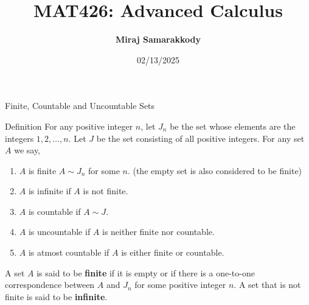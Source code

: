 \documentclass{beamer}
\title{MAT426: Advanced Calculus}
\author{\textbf{Miraj Samarakkody}}
\institute{Tougaloo College}
\date{02/13/2025}
\begin{document}
\begin{frame}
    \titlepage
\end{frame}

\begin{frame}{Finite, Countable and Uncountable Sets}
    \begin{block}{Definition}
        For any positive integer \(n\), let \(J_n\) be the set whose elements are the integers \(1, 2, \ldots, n\). Let \(J\) be the set consisting of all positive integers. For any set \(A\) we say, 
        \begin{enumerate}
            \item \(A\) is finite \(A \sim J_n\) for some \(n\). (the empty set is also considered to be finite)
            \item \(A\) is infinite if \(A\) is not finite.
            \item \(A\) is countable if \(A \sim J\). 
            \item \(A\) is uncountable if \(A\) is neither finite nor countable.
            \item \(A\) is atmost countable if \(A\) is either finite or countable.
        \end{enumerate}
    \end{block}
    A set \(A\) is said to be \textbf{finite} if it is empty or if there is a one-to-one correspondence between \(A\) and \(J_n\) for some positive integer \(n\). A set that is not finite is said to be \textbf{infinite}.

\end{frame}
\end{document}
